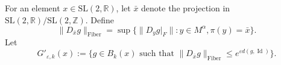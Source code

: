 \documentclass[10pt,reqno]{amsart}
\theoremstyle{Theorem}
\theoremstyle{definition}
\theoremstyle{remark}
\newcommand{\note}[1]{\marginpar{{\color{red}\footnotesize \begin{spacing}{1}#1\end{spacing}}}}
\newcommand{\restrict}[2]{{#1}{|_{{ #2}}}}
\renewcommand{\epsilon}{\varepsilon}
\newcommand{\wtd}{\widetilde}
\DeclareMathOperator{\Id}{Id}
\newcommand{\R}{\mathbb {R}}
\newcommand{\Z}{\mathbb {Z}}
\newcommand{\e}{\epsilon}
\newcommand{\Sl}{\mathrm{SL}}
\newcommand{\id}{\mathrm{Id}}
\def\calF{\mathcal F}
\def\red{\color{red}}
\def\blue{}
\begin{document}
%
%
%
%




For an element $x \in \Sl(2,\R)$, let $\bar{x}$ denote the projection in $\Sl(2,\R)/\Sl(2,\Z)$. Define
\def\fib{\text{Fiber}}
$$\|D_{\bar{x}} g\|_{\text{Fiber}} = \sup\{ \|\restrict{D_y g}{F}\| :y\in M^\alpha,  \pi(y) = \bar{x}\} .$$
Let $$G'_{\e,k}(x) := \{ g \in B_k( x) \text{ such that } \|D_{\bar{x}}g\|_{\text{Fiber}} \leq e^{\e d(g,\Id)}\}.$$
\end{document}
